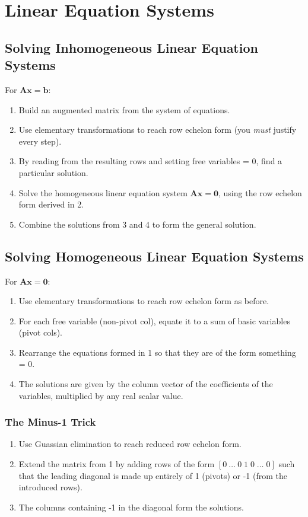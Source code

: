 \documentclass[10pt,twoside,twocolumn]{article}
\begin{document}
\section{Linear Equation Systems}


\subsection{Solving Inhomogeneous Linear Equation Systems}

For $\mathbf{A}\mathbf{x}=\mathbf{b}$: 
\begin{enumerate}
\item Build an augmented matrix from the system of equations. 
\item Use elementary transformations to reach row echelon form (you \emph{must}
justify every step). 
\item By reading from the resulting rows and setting free variables = 0,
find a particular solution. 
\item Solve the homogeneous linear equation system $\mathbf{A}\mathbf{x}=\mathbf{0}$,
using the row echelon form derived in 2. 
\item Combine the solutions from 3 and 4 to form the general solution. 
\end{enumerate}

\subsection{Solving Homogeneous Linear Equation Systems}

For $\mathbf{A}\mathbf{x}=\mathbf{0}$: 
\begin{enumerate}
\item Use elementary transformations to reach row echelon form as before. 
\item For each free variable (non-pivot col), equate it to a sum of basic
variables (pivot cols). 
\item Rearrange the equations formed in 1 so that they are of the form something
= 0. 
\item The solutions are given by the column vector of the coefficients of
the variables, multiplied by any real scalar value. 
\end{enumerate}

\subsubsection{The Minus-1 Trick}
\begin{enumerate}
\item Use Guassian elimination to reach reduced row echelon form. 
\item Extend the matrix from 1 by adding rows of the form $\left[0\:\dots\:0\;1\;0\;\dots\;0\right]$
such that the leading diagonal is made up entirely of 1 (pivots) or
-1 (from the introduced rows). 
\item The columns containing -1 in the diagonal form the solutions. 
\end{enumerate}
\end{document}
